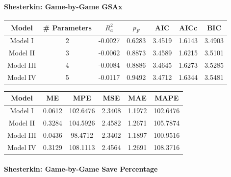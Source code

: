 \documentclass[
  10pt,
]{extarticle}
\begin{document}
\paragraph{Shesterkin: Game-by-Game GSAx}\label{shesterkin-game-by-game-gsax}

\begin{center}
\normalsize

\begin{tabular}{ccccccc}
\toprule
Model & \# Parameters & $R_a^2$ & $p_F$ & AIC & AICc & BIC\\
\midrule
Model I & 2 & -0.0027 & 0.6283 & 3.4519 & 1.6143 & 3.4903\\
Model II & 3 & -0.0062 & 0.8873 & 3.4589 & 1.6215 & 3.5101\\
Model III & 4 & -0.0084 & 0.8886 & 3.4645 & 1.6273 & 3.5285\\
Model IV & 5 & -0.0117 & 0.9492 & 3.4712 & 1.6344 & 3.5481\\
\bottomrule
\end{tabular}
\normalsize
\end{center}
\begin{center}
\normalsize

\begin{tabular}{cccccc}
\toprule
Model & ME & MPE & MSE & MAE & MAPE\\
\midrule
Model I & 0.0612 & 102.6476 & 2.3408 & 1.1972 & 102.6476\\
Model II & 0.3284 & 104.5926 & 2.4582 & 1.2671 & 105.7874\\
Model III & 0.0436 & 98.4712 & 2.3402 & 1.1897 & 100.9516\\
Model IV & 0.3129 & 108.1113 & 2.4564 & 1.2691 & 108.3716\\
\bottomrule
\end{tabular}
\normalsize
\end{center}

\paragraph{Shesterkin: Game-by-Game Save Percentage}\label{shesterkin-game-by-game-save-percentage}
\end{document}
